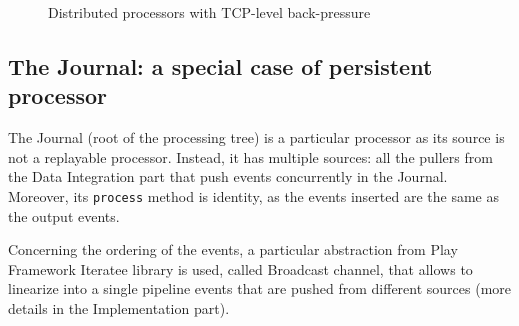\begin{figure}[h]
  \begin{center} 
    \caption{Distributed processors with TCP-level back-pressure}
    \label{fig:tcpbackpressure}
  \end{center}
\end{figure}


\subsection{The Journal: a special case of persistent processor}

The Journal (root of the processing tree) is a particular processor as its source is not a replayable processor. Instead, it has multiple sources: all the pullers from the Data
Integration part that push events concurrently in the Journal. Moreover, its \verb|process| method is identity, as the events inserted are the same as the output events.

Concerning the ordering of the events, a particular abstraction from Play Framework Iteratee library is used, called Broadcast channel, that allows to linearize into a single pipeline events that are pushed from different sources (more details in the Implementation part).

